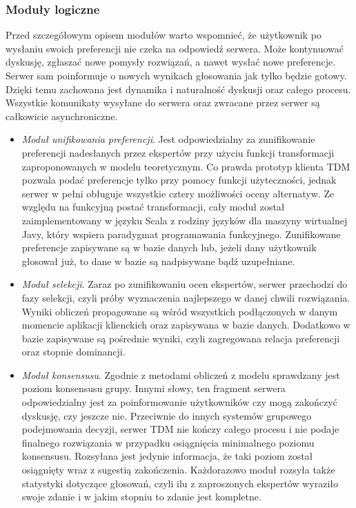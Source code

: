 \subsubsection{Moduły logiczne}
Przed szczegółowym opisem modułów warto wspomnieć, że użytkownik po wysłaniu
swoich preferencji nie czeka na odpowiedź serwera. Może kontynuować dyskusję,
zgłaszać nowe pomysły rozwiązań, a nawet wysłać nowe preferencje. Serwer sam
poinformuje o nowych wynikach głosowania jak tylko będzie gotowy. Dzięki temu
zachowana jest dynamika i naturalność dyskusji oraz całego procesu. Wszystkie
komunikaty wysyłane do serwera oraz zwracane przez serwer są całkowicie
asynchroniczne.

\begin{itemize}
  \item \emph{Moduł unifikowania preferencji}. Jest odpowiedzialny za
  zunifikowanie preferencji nadesłanych przez ekspertów przy użyciu funkcji
  transformacji zaproponowanych w modelu teoretycznym. Co prawda prototyp
  klienta TDM pozwala podać preferencje tylko przy pomocy funkcji użyteczności,
  jednak serwer w pełni obługuje wszystkie cztery możliwości oceny alternatyw.
  Ze względu na funkcyjną postać transformacji, cały moduł został
  zaimplementowany w języku Scala z rodziny języków dla maszyny wirtualnej Javy,
  który wspiera paradygmat programawania funkcyjnego. Zunifikowane preferencje
  zapisywane są w bazie danych lub, jeżeli dany użytkownik głosował już, to dane
  w bazie są nadpisywane bądź uzupełniane.

  \item \emph{Moduł selekcji}. Zaraz po zunifikowaniu ocen ekspertów, serwer
  przechodzi do fazy selekcji, czyli próby wyznaczenia najlepszego w danej
  chwili rozwiązania. Wyniki obliczeń propagowane są wśród wszystkich
  podłączonych w danym momencie aplikacji klienckich oraz zapisywana w bazie
  danych. Dodatkowo w bazie zapisywane są pośrednie wyniki, czyli zagregowana
  relacja preferencji oraz stopnie dominancji.

  \item \emph{Moduł konsensusu}. Zgodnie z metodami obliczeń z modelu
  sprawdzany jest poziom konsensusu grupy. Innymi słowy, ten fragment serwera
  odpowiedzialny jest za poinformowanie użytkowników czy mogą zakończyć
  dyskusję, czy jeszcze nie. Przeciwnie do innych systemów grupowego
  podejmowania decyzji, serwer TDM nie kończy całego procesu i nie podaje
  finalnego rozwiązania w przypadku osiągnięcia minimalnego poziomu konsensusu.
  Rozsyłana jest jedynie informacja, że taki poziom został osiągnięty wraz z
  sugestią zakończenia. Każdorazowo moduł rozsyła także statystyki dotyczące
  głosowań, czyli ilu z zaproszonych ekspertów wyraziło swoje zdanie i w jakim
  stopniu to zdanie jest kompletne.


\end{itemize}

